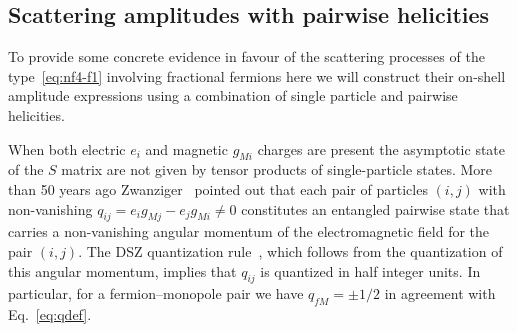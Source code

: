 \documentclass[a4paper,11pt]{article}
\begin{document}
\subsection{Scattering amplitudes with pairwise helicities}
\label{sec:2.4}
\medskip

To provide some concrete evidence in favour of the scattering processes of the type~\eqref{eq:nf4-f1} involving fractional fermions
here we will construct their on-shell amplitude expressions using a combination of single particle and pairwise helicities.

\medskip

When both electric $e_i$ and magnetic $g_{Mi}$ charges are present the asymptotic state of the $S$ matrix are not given by tensor products of single-particle states.
More than 50 years ago  Zwanziger~\cite{Zwanziger:1972sx} pointed out that each pair of particles $(i,j)$ with non-vanishing $q_{ij}=e_i g_{Mj} - e_j g_{Mi} \neq 0$ constitutes an entangled pairwise state that carries a non-vanishing angular momentum of the electromagnetic field for the pair $(i,j)$. 
The DSZ quantization rule~\cite{Dirac:1931kp,Schwinger:1975ww,Zwanziger:1968rs}, which follows from the quantization of this angular momentum, implies that $q_{ij}$ is quantized in half integer units. 
In particular, for a fermion--monopole pair we have $q_{fM} = \pm 1/2$ in agreement with Eq.~\eqref{eq:qdef}.
\end{document}
